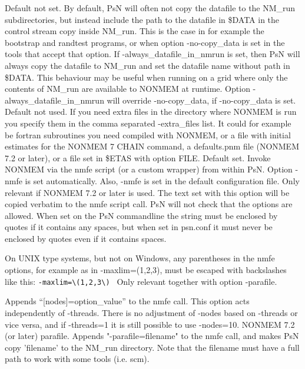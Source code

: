 \begin{optionlist}
Default not set. By default, PsN will often not copy the datafile to the NM\_run subdirectories, but instead include the path to the datafile in \$DATA in the control stream copy inside NM\_run. This is the case in for example the bootstrap and randtest programs, or when option -no-copy\_data is set in the tools that accept that option. If -always\_datafile\_in\_nmrun is set, then PsN will always copy the datafile to NM\_run and set the datafile name without path in \$DATA. This behaviour may be useful when running on a grid where only the contents of NM\_run are available to NONMEM at runtime. Option -always\_datafile\_in\_nmrun will override -no-copy\_data, if -no-copy\_data is set.
\nextopt
{}
Default not used. If you need extra files in the directory where NONMEM is run you specify them in the comma separated -extra\_files list. It could for example be fortran subroutines you need compiled with NONMEM, or a file with initial estimates for the NONMEM 7 CHAIN command, a defaults.pnm file (NONMEM 7.2 or later), or a file set in \$ETAS with option FILE. 
\nextopt
{}
Default set. Invoke NONMEM via the nmfe script (or a custom wrapper) from within PsN. Option -nmfe is 
set automatically. Also, -nmfe is set in the default configuration file.
\nextopt
{}
Only relevant if NONMEM 7.2 or later is used. The text set with this option will be copied verbatim to the nmfe script call. 
PsN will not check that the options are allowed. When set on the PsN commandline the string must be enclosed by quotes if it contains any spaces, but when set in psn.conf it must never be enclosed by quotes even if it contains spaces. 

On UNIX type systems, but not on Windows, any parentheses in the nmfe options, for example as in -maxlim=(1,2,3), must be
escaped with backslashes like this: \verb|-maxlim=\(1,2,3\) |
\nextopt
{}
Only relevant together with option -parafile. 

Appends “[nodes]=option\_value” to the nmfe call. This option acts independently of -threads. There is no adjustment of -nodes based on -threads or vice versa, and if -threads=1 it is still possible to use -nodes=10. 
\nextopt
{}
    NONMEM 7.2 (or later) parafile. Appends "-parafile=filename"
    to the nmfe call, and makes PsN copy 'filename' to the NM\_run directory.
    Note that the filename must have a full path to work with some tools (i.e. scm).
\nextopt
\end{optionlist}
